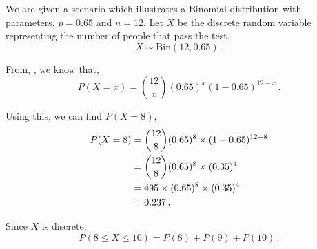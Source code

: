 %
%


\begin{subquestions}
	
\subquestion

We are given a scenario which illustrates a Binomial distribution with parameters, $p = 0.65$ and $n=12$. Let $X$ be the discrete random variable representing the number of people that pass the test,
\begin{equation}
	X \sim \text{Bin}(12,0.65) \,.
\end{equation}

\begin{subsubquestions}
	
\subsubquestion

\begin{subsubsubquestions}
	
\subsubsubquestion

From, , we know that,
\begin{equation}
	P(X = x) = { 12 \choose x} (0.65)^x (1-0.65)^{12-x} \,. \label{2009:q4:BinEqn1}
\end{equation}
	
Using this, we can find $P(X=8)$,
\begin{align}
	P(X=8) & = { 12 \choose 8} (0.65)^8 \times (1-0.65)^{12-8} \nonumber \\
		   & = { 12 \choose 8} (0.65)^8 \times (0.35)^{4} \nonumber \\
		   & = 495 \times (0.65)^8 \times (0.35)^{4} \nonumber \\
		   & = 0.237 \,.
\end{align}


\subsubsubquestion

Since $X$ is discrete,
\begin{equation}
	P(8\leq X \leq 10) = P(8)+P(9)+P(10) \,. \label{2009:q4:Bin2}
\end{equation}


\end{subsubsubquestions}
\end{subsubquestions}
\end{subquestions}
